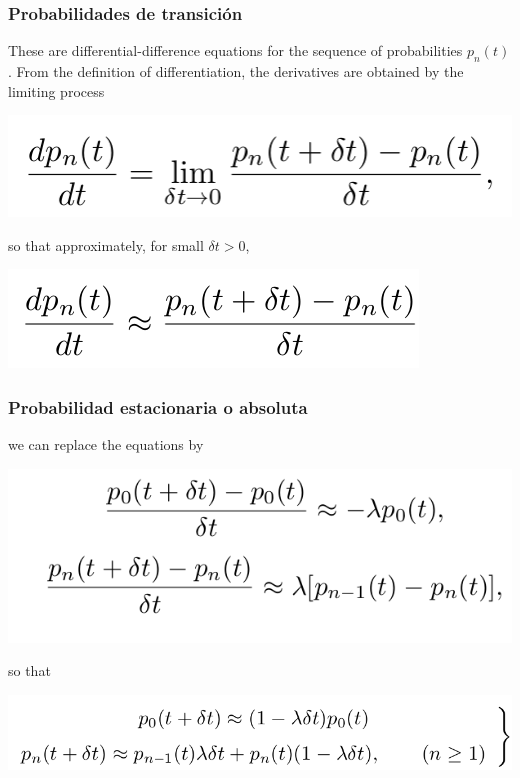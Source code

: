 \documentclass[spanish]{beamer}
\begin{document}
\begin{frame}
\frametitle{Probabilidades de transición}
These are differential-difference equations for the sequence of probabilities $p_{n}(t)$. From the definition of differentiation, the derivatives are obtained by the limiting process

\begin{center}
\includegraphics[scale=0.4]{im12}
\end{center}
so that approximately, for small $\delta t > 0$,

\begin{center}
\includegraphics[scale=0.4]{im13}
\end{center}

\end{frame}
\begin{frame}
\frametitle{Probabilidad estacionaria o absoluta}
we can replace the equations by

\begin{center}
\includegraphics[scale=0.4]{im14}
\end{center}

so that

\begin{center}
\includegraphics[scale=0.4]{im15}
\end{center}

\end{frame}
\end{document}
